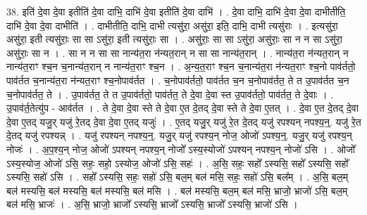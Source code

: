 \documentclass[17pt]{extarticle}
\begin{document}
38. इति॑ दे॒वा दे॒वा इतीति॑ दे॒वा दाभि॒ दाभि॑ दे॒वा इतीति॑ दे॒वा दाभि॑ । . दे॒वा दाभि॒ दाभि॑ दे॒वा दे॒वा दाभीतीति॒ दाभि॑ दे॒वा दे॒वा दाभीति॑ । . दाभीतीति॒ दाभि॒ दाभी त्यसु॑रा॒ असु॑रा॒ इति॒ दाभि॒ दाभी त्यसु॑राः । . इत्यसु॑रा॒ असु॑रा॒ इती त्यसु॑राः॒ सा सा ऽसु॑रा॒ इती त्यसु॑राः॒ सा । . असु॑राः॒ सा सा ऽसु॑रा॒ असु॑राः॒ सा न न सा ऽसु॑रा॒ असु॑राः॒ सा न । . सा न न सा सा नान्य॑त॒रा न॑न्यत॒रान् न सा सा नान्य॑त॒रान् । . नान्य॑त॒रा न॑न्यत॒रान् न नान्य॑त॒राꣳ श्च॒न च॒नान्य॑त॒रान् न नान्य॑त॒राꣳ श्च॒न । . अ॒न्य॒त॒राꣳ श्च॒न च॒नान्य॑त॒रा न॑न्यत॒राꣳ श्च॒नो पाव॑र्ततो॒ पाव॑र्तत च॒नान्य॑त॒रा न॑न्यत॒राꣳ श्च॒नोपाव॑र्तत । . च॒नोपाव॑र्ततो॒ पाव॑र्तत च॒न च॒नोपाव॑र्तत॒ ते त उ॒पाव॑र्तत च॒न च॒नोपाव॑र्तत॒ ते । . उ॒पाव॑र्तत॒ ते त उ॒पाव॑र्ततो॒ पाव॑र्तत॒ ते दे॒वा दे॒वा स्त उ॒पाव॑र्ततो॒ पाव॑र्तत॒ ते दे॒वाः । . उ॒पाव॑र्त॒तेत्यु॑प - आव॑र्तत । . ते दे॒वा दे॒वा स्ते ते दे॒वा ए॒त दे॒तद् दे॒वा स्ते ते दे॒वा ए॒तत् । . दे॒वा ए॒त दे॒तद् दे॒वा दे॒वा ए॒तद् यजु॒र् यजु॑ रे॒तद् दे॒वा दे॒वा ए॒तद् यजुः॑ । . ए॒तद् यजु॒र् यजु॑ रे॒त दे॒तद् यजु॑ रपश्यन् नपश्य॒न्॒. यजु॑ रे॒त दे॒तद् यजु॑ रपश्यन्न् । . यजु॑ रपश्यन् नपश्य॒न्॒. यजु॒र् यजु॑ रपश्य॒न् नोज॒ ओजो॑ ऽपश्य॒न्॒. यजु॒र् यजु॑ रपश्य॒न् नोजः॑ । . अ॒प॒श्य॒न् नोज॒ ओजो॑ ऽपश्यन् नपश्य॒न् नोजो᳚ ऽस्य॒स्योजो॑ ऽपश्यन् नपश्य॒न् नोजो॑ ऽसि । . ओजो᳚ ऽस्य॒स्योज॒ ओजो॑ ऽसि॒ सहः॒ सहो॒ ऽस्योज॒ ओजो॑ ऽसि॒ सहः॑ । . अ॒सि॒ सहः॒ सहो᳚ ऽस्यसि॒ सहो᳚ ऽस्यसि॒ सहो᳚ ऽस्यसि॒ सहो॑ ऽसि । . सहो᳚ ऽस्यसि॒ सहः॒ सहो॑ ऽसि॒ बल॒म् बल॑ मसि॒ सहः॒ सहो॑ ऽसि॒ बल᳚म् । . अ॒सि॒ बल॒म् बल॑ मस्यसि॒ बल॑ मस्यसि॒ बल॑ मस्यसि॒ बल॑ मसि । . बल॑ मस्यसि॒ बल॒म् बल॑ मसि॒ भ्राजो॒ भ्राजो॑ ऽसि॒ बल॒म् बल॑ मसि॒ भ्राजः॑ । . अ॒सि॒ भ्राजो॒ भ्राजो᳚ ऽस्यसि॒ भ्राजो᳚ ऽस्यसि॒ भ्राजो᳚ ऽस्यसि॒ भ्राजो॑ ऽसि । \newline
\pagebreak
{}
\end{document}

